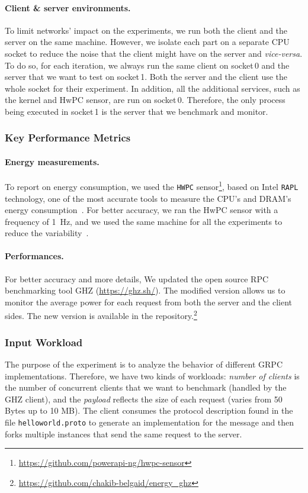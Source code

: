 \paragraph{Client \& server environments.}
To limit networks' impact on the experiments, we run both the client and the server on the same machine.
However, we isolate each part on a separate CPU socket to reduce the noise that the client might have on the server and \emph{vice-versa}.
To do so, for each iteration, we always run the same client on \textsf{socket\,0} and the server that we want to test on \textsf{socket\,1}.
Both the server and the client use the whole socket for their experiment.
In addition, all the additional services, such as the kernel and HwPC sensor, are run on \textsf{socket\,0}.
Therefore, the only process being executed in \textsf{socket\,1} is the server that we benchmark and monitor.

\subsubsection{Key Performance Metrics}
\paragraph{Energy measurements.}
To report on energy consumption, we used the \texttt{HWPC} sensor\footnote{\url{https://github.com/powerapi-ng/hwpc-sensor}}, based on Intel \texttt{RAPL} technology, one of the most accurate tools to measure the CPU's and DRAM's energy consumption~\cite{hackenberg2013power,hackenberg2015energy}.
For better accuracy, we ran the HwPC sensor with a frequency of 1~Hz, and we used the same machine for all the experiments to reduce the variability~\cite{ilsche_power_2015}.

\paragraph{Performances.}
For better accuracy and more details, We updated the open source RPC benchmarking tool GHZ (\url{https://ghz.sh/}).
The modified version allows us to monitor the average power for each request from both the server and the client sides.
The new version is available in the repository.\footnote{\url{https://github.com/chakib-belgaid/energy_ghz}}

\subsubsection{Input Workload}
The purpose of the experiment is to analyze the behavior of different GRPC implementations.
Therefore, we have two kinds of workloads: \emph{number of clients} is the number of concurrent clients that we want to benchmark (handled by the GHZ client), and the \emph{payload} reflects the size of each request (varies from 50 Bytes up to 10 MB).
The client consumes the protocol description found in the file \texttt{helloworld.proto} to generate an implementation for the message and then forks multiple instances that send the same request to the server.

